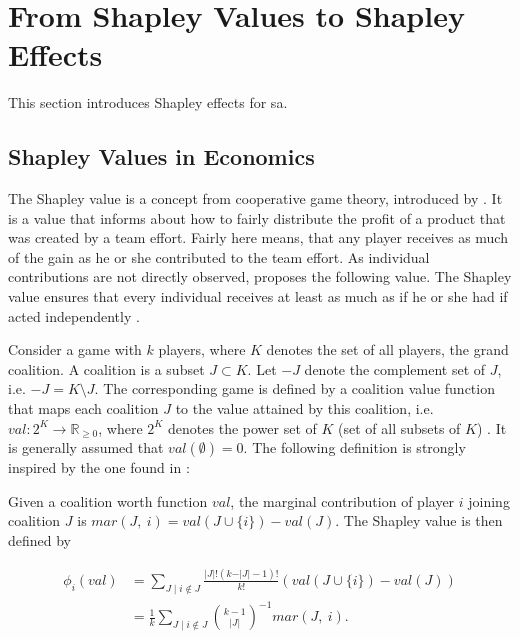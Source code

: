 \section{From Shapley Values to Shapley Effects}

This section introduces Shapley effects for sa.

\subsection{Shapley Values in Economics}

The Shapley value is a concept from cooperative game theory, introduced by \citet{S53}. It is a value that informs about how to fairly distribute the profit of a product that was created by a team effort. Fairly here means, that any player receives as much of the gain as he or she contributed to the team effort. As individual contributions are not directly observed, \citet{S53} proposes the following value. The Shapley value ensures that every individual receives at least as much as if he or she had if acted independently \citep{IP19}.

Consider a game with $k$ players, where $K$ denotes the set of all players, the grand coalition. A coalition is a subset $J \subset K$. Let $- J$ denote the complement set of $J$, i.e. $- J = K \setminus{J}$. The corresponding game is defined by a coalition value function that maps each coalition $J$ to the value attained by this coalition, i.e. $val: 2^K \to \mathbb{R}_{\geq 0}$, where $2^K$ denotes the power set of $K$ (set of all subsets of $K$) \citep{SNS16}. It is generally assumed that $val(\emptyset) = 0$. The following definition is strongly inspired by the one found in \citet{PRB20}:

\begin{definition}

Given a coalition worth function $val$, the marginal contribution of player $i$ joining coalition $J$ is $mar(J,\ i)=val(J \cup \{i\}) - val(J)$. The Shapley value is then defined by

\begin{equation}
\begin{split}
\phi_{i} (val)& = \sum_{J \mid i \notin J} \frac{\vert J \vert ! (k - \vert J \vert - 1) ! }{ k !} (val(J \cup \{i\}) - val(J)) \\
& = \frac{1}{k} \sum_{J \mid i \notin J} \binom{k-1}{\vert J \vert}^{-1} mar(J,\ i).
\end{split}
\end{equation}

\end{definition}

